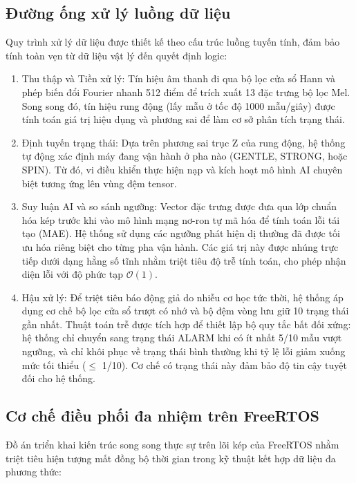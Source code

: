 \subsection{Đường ống xử lý luồng dữ liệu}

Quy trình xử lý dữ liệu được thiết kế theo cấu trúc luồng tuyến tính, đảm bảo tính toàn vẹn từ dữ liệu vật lý đến quyết định logic:

\begin{enumerate}
    \item Thu thập và Tiền xử lý: Tín hiệu âm thanh đi qua bộ lọc cửa sổ Hann và phép biến đổi Fourier nhanh 512 điểm để trích xuất 13 đặc trưng bộ lọc Mel. Song song đó, tín hiệu rung động (lấy mẫu ở tốc độ 1000 mẫu/giây) được tính toán giá trị hiệu dụng và phương sai để làm cơ sở phân tích trạng thái.
    
    \item Định tuyến trạng thái: Dựa trên phương sai trục Z của rung động, hệ thống tự động xác định máy đang vận hành ở pha nào (GENTLE, STRONG, hoặc SPIN). Từ đó, vi điều khiển thực hiện nạp và kích hoạt mô hình AI chuyên biệt tương ứng lên vùng đệm tensor.
    
    \item Suy luận AI và so sánh ngưỡng: Vector đặc trưng được đưa qua lớp chuẩn hóa kép trước khi vào mô hình mạng nơ-ron tự mã hóa để tính toán lỗi tái tạo (MAE). Hệ thống sử dụng các ngưỡng phát hiện dị thường đã được tối ưu hóa riêng biệt cho từng pha vận hành. Các giá trị này được nhúng trực tiếp dưới dạng hằng số tĩnh nhằm triệt tiêu độ trễ tính toán, cho phép nhận diện lỗi với độ phức tạp $\mathcal{O}(1)$.
    
    \item Hậu xử lý: Để triệt tiêu báo động giả do nhiễu cơ học tức thời, hệ thống áp dụng cơ chế bộ lọc cửa sổ trượt có nhớ và bộ đệm vòng lưu giữ 10 trạng thái gần nhất. Thuật toán trễ được tích hợp để thiết lập bộ quy tắc bất đối xứng: hệ thống chỉ chuyển sang trạng thái ALARM khi có ít nhất 5/10 mẫu vượt ngưỡng, và chỉ khôi phục về trạng thái bình thường khi tỷ lệ lỗi giảm xuống mức tối thiểu ($\le$ 1/10). Cơ chế có trạng thái này đảm bảo độ tin cậy tuyệt đối cho hệ thống.
\end{enumerate}

\subsection{Cơ chế điều phối đa nhiệm trên FreeRTOS}

Đồ án triển khai kiến trúc song song thực sự trên lõi kép của FreeRTOS nhằm triệt tiêu hiện tượng mất đồng bộ thời gian trong kỹ thuật kết hợp dữ liệu đa phương thức:

